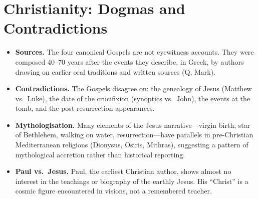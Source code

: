 \documentclass[11pt,twoside]{article}
\begin{document}
\newpage

\section{Christianity: Dogmas and Contradictions}

\begin{scheda}

\begin{itemize}
  \item \textbf{Sources.}
    The four canonical Gospels are not eyewitness
    accounts.  They were composed 40--70 years after the events they
    describe, in Greek, by authors drawing on earlier oral traditions and
    written sources (Q, Mark).
  \item \textbf{Contradictions.}
    The Gospels disagree on: the genealogy of Jesus (Matthew vs.\ Luke),
    the date of the crucifixion (synoptics vs.\ John), the events at the
    tomb, and the post-resurrection appearances.
  \item \textbf{Mythologisation.}
    Many elements of the Jesus narrative---virgin birth,
    star of Bethlehem, walking on water, resurrection---have parallels in
    pre-Christian Mediterranean religions (Dionysus,
    Osiris, Mithras), suggesting a pattern
    of mythological accretion rather than historical reporting.
  \item \textbf{Paul vs.\ Jesus.}
    Paul, the earliest Christian author, shows almost no interest in the
    teachings or biography of the earthly Jesus.  His ``Christ'' is a cosmic
    figure encountered in visions, not a remembered teacher.
\end{itemize}
\end{scheda}
\end{document}
